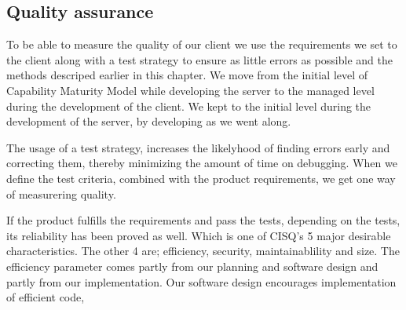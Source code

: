 \subsection{Quality assurance}
To be able to measure the quality of our client we use the requirements we set to the client along with a test strategy to ensure as little errors as possible and the methods descriped earlier in this chapter. We move from the initial level of Capability Maturity Model while developing the server to the managed level during the development of the client. We kept to the initial level during the development of the server, by developing as we went along.

The usage of a test strategy, increases the likelyhood of finding errors early and correcting them, thereby minimizing the amount of time on debugging. When we define the test criteria, combined with the product requirements, we get one way of measurering quality.

 If the product fulfills the requirements and pass the tests, depending on the tests, its reliability has been proved as well. Which is one of CISQ's 5 major desirable characteristics. The other 4 are; efficiency, security, maintainablility and size. The efficiency parameter comes partly from our planning and software design and partly from our implementation. Our software design encourages implementation of efficient code,

 